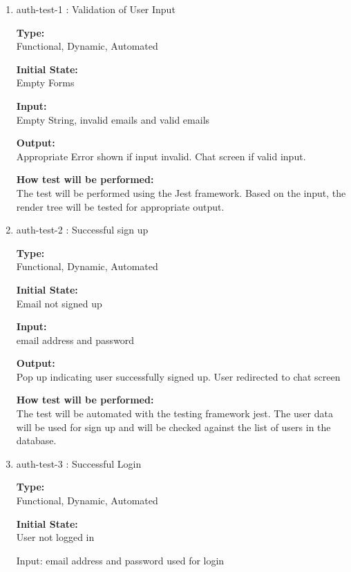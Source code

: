 \documentclass[12pt, titlepage]{article}
\begin{document}
\begin{enumerate}

\item{auth-test-1 : Validation of User Input\\}

\textbf{Type:}\\ Functional, Dynamic, Automated

\textbf{Initial State:}\\ Empty Forms
					
\textbf{Input:}\\ Empty String, invalid emails and valid emails 
					
\textbf{Output:}\\ Appropriate Error shown if input invalid. Chat screen if valid input.
					
\textbf{How test will be performed:}\\ The test will be performed using the Jest framework. Based on the input, the render tree will be tested for appropriate output.
					
\item{auth-test-2 : Successful sign up\\}

\textbf{Type:}\\ Functional, Dynamic, Automated 
					
\textbf{Initial State:}\\ Email not signed up
					
\textbf{Input:}\\ email address and password
					
\textbf{Output:}\\ Pop up indicating user successfully signed up. User redirected to chat screen
					
\textbf{How test will be performed:}\\ 
The test will be automated with the testing framework jest. The user data will be used for sign up and will be checked against the list of users in the database.

\item{auth-test-3 : Successful Login\\}

\textbf{Type:}\\ Functional, Dynamic, Automated 
					
\textbf{Initial State:}\\ User not logged in
					
Input: email address and password used for login
					

\end{enumerate}
\end{document}
